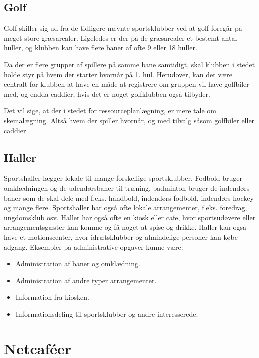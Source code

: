 \subsection{Golf}

Golf skiller sig ud fra de tidligere nævnte sportsklubber ved at golf foregår på meget store græsarealer. Ligeledes er der på de græsarealer et bestemt antal huller, og klubben kan have flere baner af ofte 9 eller 18 huller. 

Da der er flere grupper af spillere på samme bane samtidigt, skal klubben i stedet holde styr på hvem der starter hvornår på 1. hul. Herudover, kan det være centralt for klubben at have en måde at registrere om gruppen vil have golfbiler med, og endda caddier, hvis det er noget golfklubben også tilbyder.

Det vil sige, at der i stedet for ressourceplanlægning, er mere tale om skemalægning. Altså hvem der spiller hvornår, og med tilvalg såsom golfbiler eller caddier.


\subsection{Haller}

Sportshaller lægger lokale til mange forskellige sportsklubber. Fodbold bruger omklædningen og de udendørsbaner til træning, badminton bruger de indendørs baner som de skal dele med f.eks. håndbold, indendørs fodbold, indendørs hockey og mange flere. Sportshaller har også ofte lokale arrangementer, f.eks. foredrag, ungdomsklub osv. 
Haller har også ofte en kiosk eller cafe, hvor sportsudøvere eller arrangementsgæster kan komme og få noget at spise og drikke. 
Haller kan også have et motionscenter, hvor idrætsklubber og almindelige personer kan købe adgang. 
Eksempler på administrative opgaver kunne være:

\begin{itemize}
\item Administration af baner og omklædning.
\item Administration af andre typer arrangementer.
\item Information fra kiosken.
\item Informationsdeling til sportsklubber og andre interesserede.
\end{itemize}


\section{Netcaféer}\label{chap:netcafeer}

